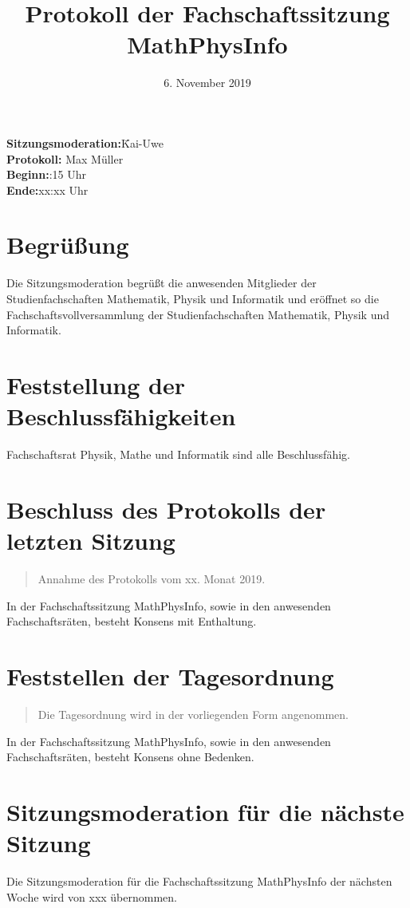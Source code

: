 \documentclass[11pt, fachschaft=mathphys,twosided=true]{mathphys/mathphys-article}
\newenvironment{antrag}{\begin{quote}\begin{itshape}}{\end{itshape}\end{quote}}
\newcommand{\konsens}[1]{In der Fachschaftssitzung MathPhysInfo, sowie in den anwesenden Fachschaftsräten, besteht Konsens ohne Bedenken.\\} %
\newcommand{\konsensE}[1]{In der Fachschaftssitzung MathPhysInfo, sowie in den anwesenden Fachschaftsräten, besteht Konsens mit Enthaltung.\\} %
\begin{document}
        \date{\vspace{-2em}6. November 2019\vspace{-1em}} %
        \title{\vspace{-2em}Protokoll der Fachschaftssitzung MathPhysInfo}
        \maketitle
        \begin{tabbing}
            \textbf{Sitzungsmoderation:}\quad\=Kai-Uwe \\ %
            \textbf{Protokoll:}\> Max M\"uller \\%
            \textbf{Beginn:}:15 Uhr\\
            \textbf{Ende:}\>xx:xx Uhr\\ %
        \end{tabbing}
        \section{Begrüßung}
            Die Sitzungsmoderation begrüßt die anwesenden Mitglieder der Studienfachschaften Mathematik, Physik und Informatik und eröffnet so die Fachschaftsvollversammlung der Studienfachschaften Mathematik, Physik und Informatik.
        \section{Feststellung der Beschlussfähigkeiten}
            Fachschaftsrat Physik, Mathe und Informatik sind alle Beschlussfähig.
        \section{Beschluss des Protokolls der letzten Sitzung}
        \begin{antrag}
        	Annahme des Protokolls vom xx. Monat 2019.
        \end{antrag}
        \konsensE{}
        \section{Feststellen der Tagesordnung}
        \begin{antrag}
            Die Tagesordnung wird in der vorliegenden Form angenommen.
        \end{antrag}
        \konsens{}
        \section{Sitzungsmoderation für die nächste Sitzung}
            Die Sitzungsmoderation für die Fachschaftssitzung MathPhysInfo der nächsten Woche wird von xxx übernommen. %
\end{document}
